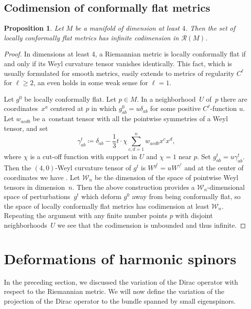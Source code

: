\documentclass[11pt]{article}
\numberwithin{equation}{section}
\newcommand\ceq{\coloneqq}
\newcommand\<{\langle}
\renewcommand\>{\rangle}
\newcommand{\maR}{\mathcal R}
\newcommand{\maW}{\mathcal W}
\newtheorem{Proposition}[Theorem]{Proposition}
\theoremstyle{definition}
\newcommand\={\,=\,}
\numberwithin{equation}{section}
\begin{document}
\subsection{Codimension of conformally flat metrics}

\begin{Proposition} \label{prop.CF.codim}
Let $M$ be a manifold of dimension at least $4$. Then the set of locally conformally flat metrics has infinite codimension in $\maR(M)$.
\end{Proposition}

\begin{proof}
 In dimensions at least 4, a Riemannian metric is locally conformally flat if and only if its Weyl curvature tensor vanishes identically.
 This fact, which is usually formulated for smooth metrics, easily extends to metrics of regularity $C^\ell$ for $\ell\geq 2$, an even holds in some weak sense for $\ell=1$.

Let $g^0$ be locally conformally flat. Let $ p \in M$. In a neighborhood~$U$ of~$p$ there are coordinates~$x^a$ centered at $p$ in which $g^0_{ab} = u \delta_{ab}$ for some positive $C^\ell$-function $u$. Let $w_{acdb}$ be a~constant tensor with all the pointwise symmetries of a Weyl tensor, and set
\[
\gamma^t_{ab} \ceq \delta_{ab} - \frac{1}{3} t \cdot \chi \sum_{c,d=1}^n w_{acdb} x^c x^d,
\]
where $\chi$ is a cut-off function with support in $U$ and $\chi=1$ near $p$. Set $g^t_{ab} = u \gamma^t_{ab}$. Then the $(4,0)$-Weyl curvature tensor of $g^t$ is $W^{g^t} = u W^{\gamma^t}$ and at the center of coordinates we have . Let $\maW_n$ be the dimension of the space of pointwise Weyl tensors in dimension~$n$. Then the above construction provides a $\maW_n$-dimensional space of perturbations~$g^t$ which deform $g^0$ away from being conformally flat, so the space of locally conformally flat metrics has codimension at least $\maW_n$. Repeating the argument with any finite number points $p$ with disjoint neighborhoods~$U$ we see that the codimension is unbounded and thus infinite.
\end{proof}

\section{Deformations of harmonic spinors}\label{sec.def.harm.spinors}

In the preceding section, we discussed the variation of the Dirac operator with respect to the Riemannian metric. We will now define the variation of the projection of the Dirac operator to the bundle spanned by small eigenspinors.
\end{document}
